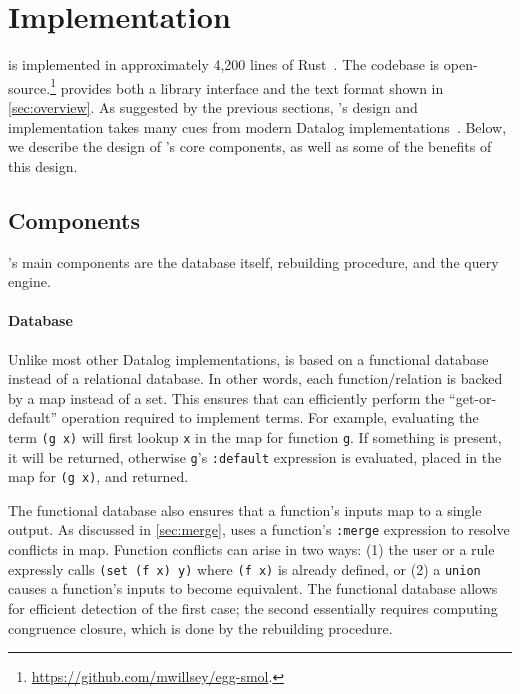 \section{Implementation}
\label{sec:impl}

\Egglog is implemented in approximately 4,200 lines of Rust~\cite{rust}.
The codebase is open-source.\footnote{\url{https://github.com/mwillsey/egg-smol}.}
\Egglog provides both a library interface 
 and the text format shown in \autoref{sec:overview}.
As suggested by the previous sections,
 \egglog's design and implementation takes
 many cues from modern Datalog implementations~\cite{souffle,ascent,inca}.
Below, 
 we describe the design of \egglog's core components,
 as well as some of the benefits of this design.

\subsection{Components}\label{sec:components}

\Egglog's main components are 
 the database itself,
 rebuilding procedure,
 and the query engine.

\paragraph{Database}
Unlike most other Datalog implementations,
 \Egglog is based on a functional database instead of a relational database.
In other words, 
 each function/relation is backed by a map instead of a set.
This ensures that \Egglog can efficiently 
 perform the ``get-or-default'' operation required to implement terms.
For example,
 evaluating the term \lstinline{(g x)}
 will first lookup \lstinline{x} in the map for function \lstinline{g}.
If something is present, 
 it will be returned,
 otherwise \lstinline{g}'s 
 \lstinline{:default} expression is evaluated,
 placed in the map for \lstinline{(g x)},
 and returned.

The functional database also ensures that 
 a function's inputs map to a single output.
As discussed in \autoref{sec:merge},
 \egglog uses a function's \lstinline{:merge} expression
 to resolve conflicts in map.
Function conflicts can arise in two ways:
 (1) the user or a rule expressly calls 
 \lstinline{(set (f x) y)} where \lstinline{(f x)} is already defined,
 or 
 (2) a \lstinline{union} causes a function's inputs to become equivalent.
The functional database allows for efficient detection of the first case;
 the second essentially requires computing congruence closure,
 which is done by the rebuilding procedure.


